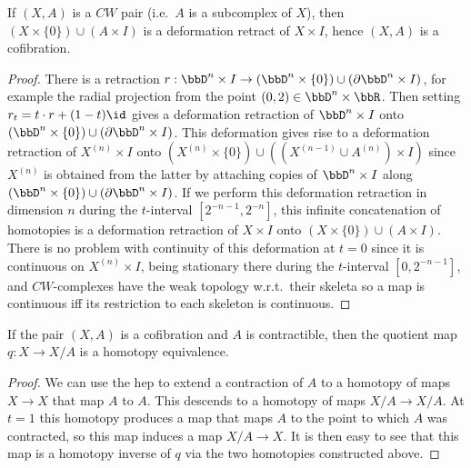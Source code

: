 \begin{prop}\label{prop 0.16 Hatcher}
    If $(X,A)$ is a $CW$ pair (i.e.~$A$ is a subcomplex of $X$), then $(X\times\{0\})\cup (A\times I)$ is a deformation retract of $X\times I$, hence $(X,A)$ is a cofibration.
\end{prop}
\begin{proof}
    There is a retraction $r:\bbD^n\times I\to (\bbD^n\times\{0\})\cup (\partial \bbD^n\times I)$, for example the radial projection from the point $(0,2)\in \bbD^n\times \bbR$. Then setting $r_t=t\cdot r+(1-t)\id$ gives a deformation retraction of $\bbD^n\times I$ onto $(\bbD^n\times\{0\})\cup (\partial \bbD^n\times I)$. This deformation gives rise to a deformation retraction of $X^{(n)}\times I$ onto $(X^{(n)}\times\{0\})\cup ((X^{(n-1)}\cup A^{(n)})\times I)$ since $X^{(n)}$ is obtained from the latter by attaching copies of $\bbD^n\times I$ along $(\bbD^n\times\{0\})\cup (\partial \bbD^n\times I)$. If we perform this deformation retraction in dimension $n$ during the $t$-interval $[2^{-n-1},2^{-n}]$, this infinite concatenation of homotopies is a deformation retraction of $X\times I$ onto $(X\times\{0\})\cup (A\times I)$. There is no problem with continuity of this deformation at $t=0$ since it is continuous on $X^{(n)}\times I$, being stationary there during the $t$-interval $[0,2^{-n-1}]$, and $CW$-complexes have the weak topology w.r.t.\ their skeleta so a map is continuous iff its restriction to each skeleton is continuous.
\end{proof}

\begin{prop}
    If the pair $(X,A)$ is a cofibration and $A$ is contractible, then the quotient map $q:X\to X\slash A$ is a homotopy equivalence.
\end{prop}
\begin{proof}
    We can use the \gls{hep} to extend a contraction of $A$ to a homotopy of maps $X\to X$ that map $A$ to $A$. This descends to a homotopy of maps $X\slash A\to X\slash A$. At $t=1$ this homotopy produces a map that maps $A$ to the point to which $A$ was contracted, so this map induces a map $X\slash A\to X$. It is then easy to see that this map is a homotopy inverse of $q$ via the two homotopies constructed above.
\end{proof}

